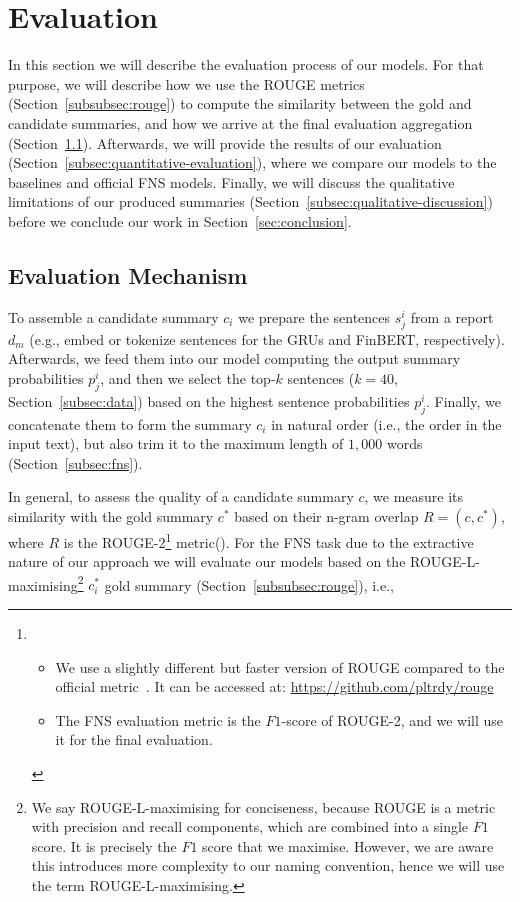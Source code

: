 \section{Evaluation}\label{sec:evaluation}
In this section we will describe the evaluation process of our models.
For that purpose, we will describe how we use the ROUGE metrics (Section~\ref{subsubsec:rouge}) to compute the
similarity between the gold and candidate summaries, and how we arrive at the final evaluation aggregation (Section~\ref{subsec:evaluation-mechanism}).
Afterwards, we will provide the results of our evaluation (Section~\ref{subsec:quantitative-evaluation}), where we compare our models to the baselines and official FNS models.
Finally, we will discuss the qualitative limitations of our produced summaries (Section~\ref{subsec:qualitative-discussion}) before we conclude our work in Section~\ref{sec:conclusion}.

\subsection{Evaluation Mechanism}\label{subsec:evaluation-mechanism}
To assemble a candidate summary $c_{i}$ we prepare the sentences $s_{j}^{i}$ from a report $d_{m}$ (e.g., embed or tokenize sentences for the GRUs and FinBERT, respectively).
Afterwards, we feed them into our model computing the output summary probabilities $p_{j}^{i}$, and then we select the
top-$k$ sentences ($k=40$, Section~\ref{subsec:data}) based on the highest sentence probabilities $p_{j}^{i}$.
Finally, we concatenate them to form the summary $c_{i}$ in natural order (i.e., the order in the input text),
but also trim it to the maximum length of $1,000$ words (Section~\ref{subsec:fns}).

In general, to assess the quality of a candidate summary $c$, we measure its similarity with the gold summary $c^{*}$
based on their n-gram overlap $R=(c, c^{*})$, where $R$ is the ROUGE-2\footnote{
    \begin{itemize}
        \item We use a slightly different but faster version of ROUGE compared to the official metric~\cite{lin2004rouge}.
              It can be accessed at: \url{https://github.com/pltrdy/rouge}
        \item The FNS evaluation metric is the $F1$-score of ROUGE-2, and we will use it for the final evaluation.
    \end{itemize}
} metric(\cite{lin2004rouge}).
For the FNS task due to the extractive nature of our approach we will evaluate our models based on
the ROUGE-L-maximising\footnote{
    We say ROUGE-L-maximising for conciseness, because ROUGE is a metric with precision and recall components, which are combined into a single $F1$ score.
    It is precisely the $F1$ score that we maximise.
    However, we are aware this introduces more complexity to our naming convention, hence we will use the term ROUGE-L-maximising.
} $c^{*}_{i}$ gold summary (Section~\ref{subsubsec:rouge}), i.e.,


